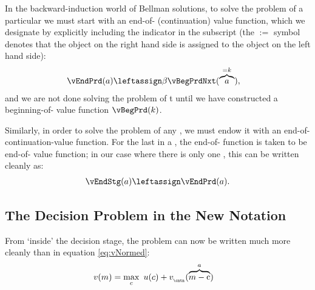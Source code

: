 \documentclass[titlepage, headings=optiontotocandhead]{econtex}
\begin{document}
  In the backward-induction world of Bellman solutions, to solve the problem of a particular {\interval} we must start with an end-of-{\interval} (continuation) value function, which we designate by explicitly including the {\interval} indicator in the subscript (the $:=$ symbol denotes that the object on the right hand side is assigned to the object on the left hand side):
  \begin{equation}\begin{gathered}\begin{aligned}
        \vEndPrd(a) & \leftassign \beta \vBegPrdNxt(\overbrace{a}^{=k}), \label{eq:trns-single-prd}
  \end{aligned}\end{gathered}\end{equation}
and we are not done solving the problem of {\interval} {t} until we have constructed a beginning-of-{\interval} value function $\vBegPrd(k)$.

Similarly, in order to solve the problem of any {\stg}, we must endow it with an end-of-{\stg} continuation-value function.  For the last {\stg} in a {\interval}, the end-of-{\stg} function is taken to be end-of-{\interval} value function; in our case where there is only one {\stg}, this can be written cleanly as:
  \begin{equation}\begin{gathered}\begin{aligned}
        \vEndStg(a) \leftassign \vEndPrd(a).
      \end{aligned}\end{gathered}\end{equation}
\subsection{The Decision Problem in the New Notation}\label{subsec:decision-problem}\hypertarget{decision-problem}{}

From `inside' the decision stage, the {\Decision} problem can now be written much more cleanly than in equation \eqref{eq:vNormed}:
  \begin{equation}\begin{gathered}\begin{aligned}
        v(m) & = \max_{c}~ u(c) + v_{_\cntn}(\overbrace{m-\mathrm{c}}^{a}) \label{eq:vMid}
      \end{aligned}\end{gathered}\end{equation}
\end{document}
